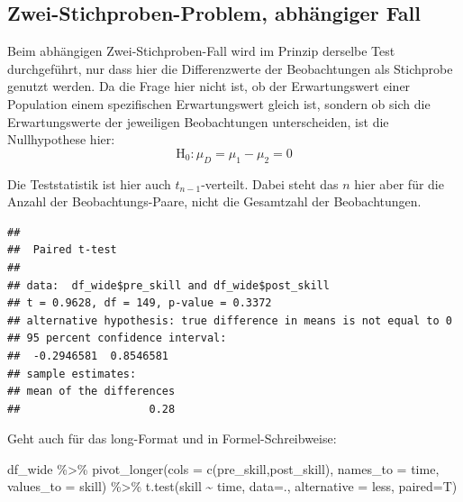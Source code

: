\documentclass[
]{book}
\newenvironment{Shaded}{\begin{snugshade}}{\end{snugshade}}
\newcommand{\AttributeTok}[1]{\textcolor[rgb]{0.77,0.63,0.00}{#1}}
\newcommand{\ConstantTok}[1]{\textcolor[rgb]{0.00,0.00,0.00}{#1}}
\newcommand{\FunctionTok}[1]{\textcolor[rgb]{0.00,0.00,0.00}{#1}}
\newcommand{\NormalTok}[1]{#1}
\newcommand{\SpecialCharTok}[1]{\textcolor[rgb]{0.00,0.00,0.00}{#1}}
\newcommand{\StringTok}[1]{\textcolor[rgb]{0.31,0.60,0.02}{#1}}
\begin{document}
\hypertarget{zwei-stichproben-problem-abhuxe4ngiger-fall}{%
\subsection{Zwei-Stichproben-Problem, abhängiger Fall}\label{zwei-stichproben-problem-abhuxe4ngiger-fall}}

Beim abhängigen Zwei-Stichproben-Fall wird im Prinzip derselbe Test durchgeführt, nur dass hier die Differenzwerte der Beobachtungen als Stichprobe genutzt werden. Da die Frage hier nicht ist, ob der Erwartungswert einer Population einem spezifischen Erwartungswert gleich ist, sondern ob sich die Erwartungswerte der jeweiligen Beobachtungen unterscheiden, ist die Nullhypothese hier: \[\text{H}_0: { \mu}_D =  { \mu}_1 - { \mu}_2= 0 \]

Die Teststatistik ist hier auch \(t_{n-1}\)-verteilt. Dabei steht das \(n\) hier aber für die Anzahl der Beobachtungs-Paare, nicht die Gesamtzahl der Beobachtungen.

\begin{Shaded}
\end{Shaded}

\begin{verbatim}
## 
##  Paired t-test
## 
## data:  df_wide$pre_skill and df_wide$post_skill
## t = 0.9628, df = 149, p-value = 0.3372
## alternative hypothesis: true difference in means is not equal to 0
## 95 percent confidence interval:
##  -0.2946581  0.8546581
## sample estimates:
## mean of the differences 
##                    0.28
\end{verbatim}

Geht auch für das long-Format und in Formel-Schreibweise:

\begin{Shaded}
\begin{Highlighting}[]
\NormalTok{df\_wide }\SpecialCharTok{\%\textgreater{}\%} 
  \FunctionTok{pivot\_longer}\NormalTok{(}\AttributeTok{cols =} \FunctionTok{c}\NormalTok{(pre\_skill,post\_skill),}
               \AttributeTok{names\_to =} \StringTok{\textquotesingle{}time\textquotesingle{}}\NormalTok{,}
               \AttributeTok{values\_to =} \StringTok{\textquotesingle{}skill\textquotesingle{}}\NormalTok{) }\SpecialCharTok{\%\textgreater{}\%} 
  \FunctionTok{t.test}\NormalTok{(skill }\SpecialCharTok{\textasciitilde{}}\NormalTok{ time, }\AttributeTok{data=}\NormalTok{.,}
         \AttributeTok{alternative =} \StringTok{\textquotesingle{}less\textquotesingle{}}\NormalTok{, }\AttributeTok{paired=}\NormalTok{T)}
\end{Highlighting}
\end{Shaded}
\end{document}
